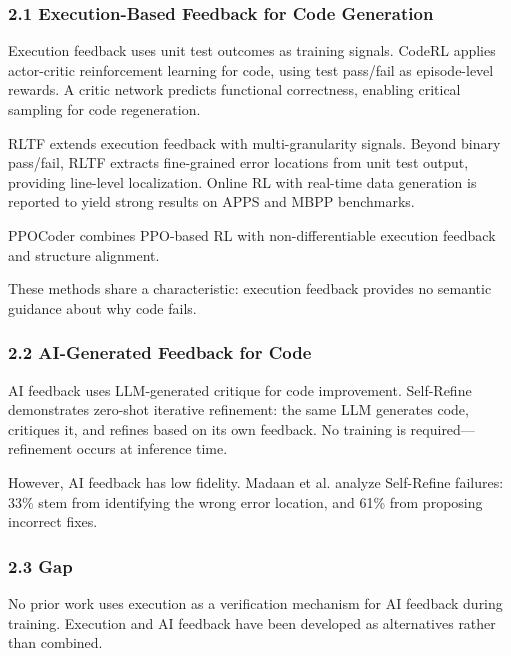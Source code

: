 
\subsubsection{2.1 Execution-Based Feedback for Code Generation}

Execution feedback uses unit test outcomes as training signals. CodeRL \citep{le2022coderl} applies actor-critic reinforcement learning for code, using test pass/fail as episode-level rewards. A critic network predicts functional correctness, enabling critical sampling for code regeneration.

RLTF \citep{liu2023rltf} extends execution feedback with multi-granularity signals. Beyond binary pass/fail, RLTF extracts fine-grained error locations from unit test output, providing line-level localization. Online RL with real-time data generation is reported to yield strong results on APPS and MBPP benchmarks.

PPOCoder \citep{shojaee2023ppocoder} combines PPO-based RL with non-differentiable execution feedback and structure alignment.

These methods share a characteristic: execution feedback provides no semantic guidance about why code fails.

\subsubsection{2.2 AI-Generated Feedback for Code}

AI feedback uses LLM-generated critique for code improvement. Self-Refine \citep{madaan2023selfrefine} demonstrates zero-shot iterative refinement: the same LLM generates code, critiques it, and refines based on its own feedback. No training is required---refinement occurs at inference time.

However, AI feedback has low fidelity. Madaan et al. analyze Self-Refine failures: 33\% stem from identifying the wrong error location, and 61\% from proposing incorrect fixes.

\subsubsection{2.3 Gap}

No prior work uses execution as a verification mechanism for AI feedback during training. Execution and AI feedback have been developed as alternatives rather than combined.
